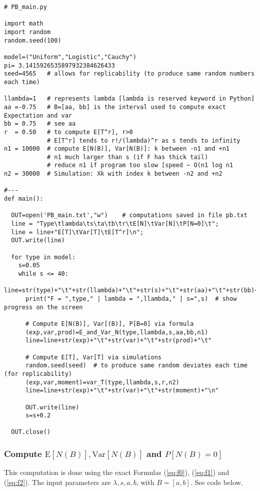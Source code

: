 \documentclass[10pt]{article}
\begin{document}
\begin{lstlisting}
# PB_main.py

import math
import random
random.seed(100)

model=("Uniform","Logistic","Cauchy")
pi= 3.1415926535897932384626433
seed=4565   # allows for replicability (to produce same random numbers each time)

llambda=1   # represents lambda [lambda is reserved keyword in Python]
aa =-0.75   # B=[aa, bb] is the interval used to compute exact Expectation and var
bb = 0.75   # see aa
r  = 0.50   # to compute E[T^r], r>0
            # E[T^r] tends to r!/(lambda)^r as s tends to infinity
n1 = 10000  # compute E[N(B)], Var[N(B)]: k between -n1 and +n1
            # n1 much larger than s (if F has thick tail)
            # reduce n1 if program too slow [speed ~ O(n1 log n1
n2 = 30000  # Simulation: Xk with index k between -n2 and +n2

#---
def main():

  OUT=open('PB_main.txt',"w")    # computations saved in file pb.txt
  line = "Type\tlambda\ts\ta\tb\tr\tE[N]\tVar[N]\tP[N=0]\t";
  line = line+"E[T]\tVar[T]\tE[T^r]\n";
  OUT.write(line)

  for type in model:
    s=0.05
    while s <= 40:
      line=str(type)+"\t"+str(llambda)+"\t"+str(s)+"\t"+str(aa)+"\t"+str(bb)+"\t"+str(r)+"\t"
      print("F = ",type," | lambda = ",llambda," | s=",s)  # show progress on the screen
  
      # Compute E[N(B)], Var[(B)], P[B=0] via formula
      (exp,var,prod)=E_and_Var_N(type,llambda,s,aa,bb,n1)
      line=line+str(exp)+"\t"+str(var)+"\t"+str(prod)+"\t"

      # Compute E[T], Var[T] via simulations
      random.seed(seed)  # to produce same random deviates each time (for replicability)
      (exp,var,moment)=var_T(type,llambda,s,r,n2)
      line=line+str(exp)+"\t"+str(var)+"\t"+str(moment)+"\n"

      OUT.write(line)
      s=s+0.2

  OUT.close()

\end{lstlisting}
\subsubsection{Compute $\mbox{E}[N(B)], \mbox{Var}[N(B)]$ and $P[N(B)=0]$}\label{enpi}
This computation is done using the exact Formulas (\ref{eq:f0}),  (\ref{eq:f1}) and (\ref{eq:f2}). The input parameters are $\lambda,s, a, b$, with $B=[a,b]$. See code below.
\end{document}
